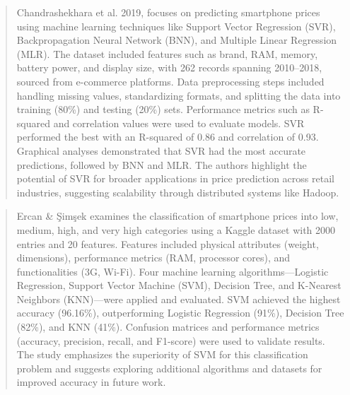 \documentclass[12pt]{report}
\begin{document}
\begin{quotation}
  Chandrashekhara et al. \cite{chandrashekhara2019} 2019, focuses on predicting smartphone prices using machine learning techniques like Support Vector Regression (SVR), Backpropagation Neural Network (BNN), and Multiple Linear Regression (MLR). The dataset included features such as brand, RAM, memory, battery power, and display size, with 262 records spanning 2010–2018, sourced from e-commerce platforms. Data preprocessing steps included handling missing values, standardizing formats, and splitting the data into training (80\%) and testing (20\%) sets. Performance metrics such as R-squared and correlation values were used to evaluate models. SVR performed the best with an R-squared of 0.86 and correlation of 0.93. Graphical analyses demonstrated that SVR had the most accurate predictions, followed by BNN and MLR. The authors highlight the potential of SVR for broader applications in price prediction across retail industries, suggesting scalability through distributed systems like Hadoop.
\end{quotation}

\begin{quotation}
  Ercan \& Şimşek \cite{ercan2023} examines the classification of smartphone prices into low, medium, high, and very high categories using a Kaggle dataset with 2000 entries and 20 features. Features included physical attributes (weight, dimensions), performance metrics (RAM, processor cores), and functionalities (3G, Wi-Fi). Four machine learning algorithms—Logistic Regression, Support Vector Machine (SVM), Decision Tree, and K-Nearest Neighbors (KNN)—were applied and evaluated. SVM achieved the highest accuracy (96.16\%), outperforming Logistic Regression (91\%), Decision Tree (82\%), and KNN (41\%). Confusion matrices and performance metrics (accuracy, precision, recall, and F1-score) were used to validate results. The study emphasizes the superiority of SVM for this classification problem and suggests exploring additional algorithms and datasets for improved accuracy in future work.
\end{quotation}
\end{document}
